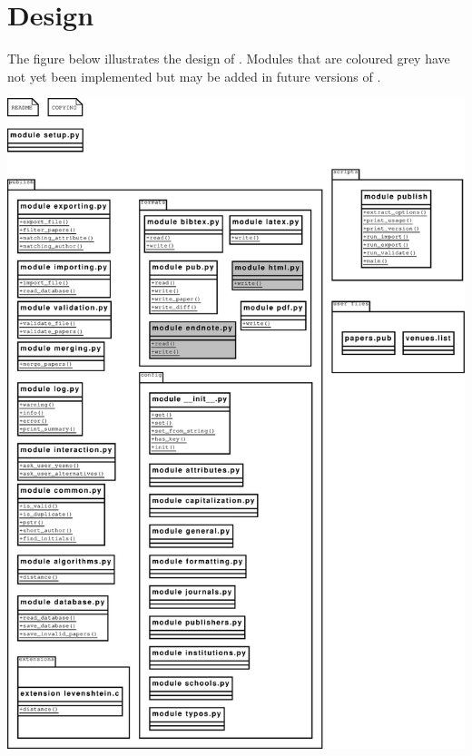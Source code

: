 \chapter{Design}
\label{design}

The figure below illustrates the design of \package{}. Modules that are
coloured grey have not yet been implemented but may be added in future
versions of \package{}.

\newpage

\includegraphics[width=13.5cm]{images/diagram.eps}
